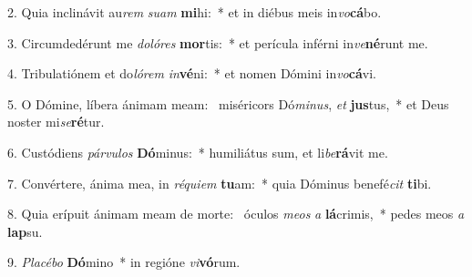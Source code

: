 2. Quia inclinávit au\textit{rem} \textit{su}\textit{am} \textbf{mi}hi:~*  et in diébus meis in\textit{vo}\textbf{cá}bo.\

3. Circumdedérunt me \textit{do}\textit{ló}\textit{res} \textbf{mor}tis:~*  et perícula inférni in\textit{ve}\textbf{né}runt me.\

4. Tribulatiónem et do\textit{ló}\textit{rem} \textit{in}\textbf{vé}ni:~*  et nomen Dómini in\textit{vo}\textbf{cá}vi.\

5. O Dómine, líbera ánimam meam: \dag\  miséricors Dó\textit{mi}\textit{nus}, \textit{et} \textbf{jus}tus,~*  et Deus noster mi\textit{se}\textbf{ré}tur.\

6. Custódiens \textit{pár}\textit{vu}\textit{los} \textbf{Dó}minus:~*  humiliátus sum, et li\textit{be}\textbf{rá}vit me.\

7. Convértere, ánima mea, in \textit{ré}\textit{qui}\textit{em} \textbf{tu}am:~*  quia Dóminus benefé\textit{cit} \textbf{ti}bi.\

8. Quia erípuit ánimam meam de morte: \dag\  óculos \textit{me}\textit{os} \textit{a} \textbf{lá}crimis,~*  pedes meos \textit{a} \textbf{lap}su.\

9. \textit{Pla}\textit{cé}\textit{bo} \textbf{Dó}mino~*  in regióne \textit{vi}\textbf{vó}rum.\

